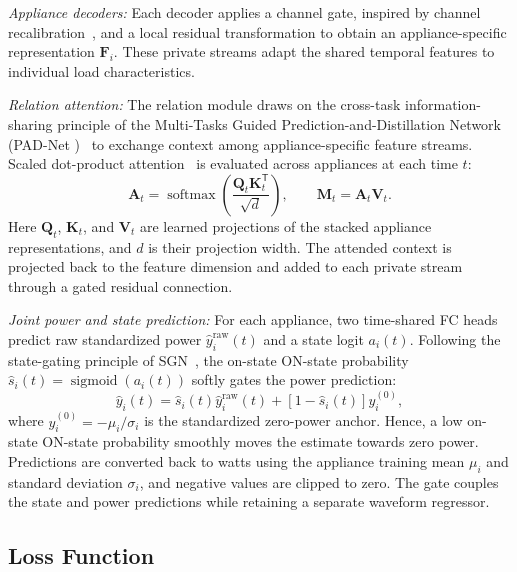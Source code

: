 \documentclass[journal]{IEEEtran}
\providecommand{\DIFadd}[1]{{\protect\color{blue} \sf #1}} %
\providecommand{\DIFdel}[1]{{\protect\color{red} \scriptsize #1}} %
\providecommand{\DIFaddbegin}{} %
\providecommand{\DIFaddend}{} %
\providecommand{\DIFdelbegin}{} %
\providecommand{\DIFdelend}{} %
\providecommand{\DIFscaledelfig}{0.5}
\newlength{\DIFdelgraphicswidth} %
\newlength{\DIFdelgraphicsheight} %
\providecommand{\DIFaddincludegraphics}[2][]{{\color{blue}\fbox{\DIFOincludegraphics[#1]{#2}}}} %
\providecommand{\DIFdelincludegraphics}[2][]{%
\sbox{\DIFdelgraphicsbox}{\DIFOincludegraphics[#1]{#2}}%
\settoboxwidth{\DIFdelgraphicswidth}{\DIFdelgraphicsbox} %
\settoboxtotalheight{\DIFdelgraphicsheight}{\DIFdelgraphicsbox} %
\scalebox{\DIFscaledelfig}{%
\parbox[b]{\DIFdelgraphicswidth}{\usebox{\DIFdelgraphicsbox}\\[-\baselineskip] \rule{\DIFdelgraphicswidth}{0em}}\llap{\resizebox{\DIFdelgraphicswidth}{\DIFdelgraphicsheight}{%
\setlength{\unitlength}{\DIFdelgraphicswidth}%
\begin{picture}(1,1)%
\thicklines\linethickness{2pt} %
{\color[rgb]{1,0,0}\put(0,0){\framebox(1,1){}}}%
{\color[rgb]{1,0,0}\put(0,0){\line( 1,1){1}}}%
{\color[rgb]{1,0,0}\put(0,1){\line(1,-1){1}}}%
\end{picture}%
}\hspace*{3pt}}} %
} %
\DeclareRobustCommand{\DIFaddbegin}{\DIFOaddbegin \let\includegraphics\DIFaddincludegraphics} %
\DeclareRobustCommand{\DIFaddend}{\DIFOaddend \let\includegraphics\DIFOincludegraphics} %
\DeclareRobustCommand{\DIFdelbegin}{\DIFOdelbegin \let\includegraphics\DIFdelincludegraphics} %
\DeclareRobustCommand{\DIFdelend}{\DIFOaddend \let\includegraphics\DIFOincludegraphics} %
\begin{document}
\textit{Appliance decoders:}
Each decoder applies a channel gate, inspired by channel recalibration~\cite{hu2018senet}, and a local residual transformation to obtain an appliance-specific representation $\mathbf{F}_i$. These private streams adapt the shared temporal features to individual load characteristics.

\textit{Relation attention:}
The relation module draws on the cross-task information-sharing principle of \DIFaddbegin \DIFadd{the Multi-Tasks Guided Prediction-and-Distillation Network (}\DIFaddend PAD-Net\DIFaddbegin \DIFadd{)}\DIFaddend ~\cite{xu2018padnet} to exchange context among appliance-specific feature streams. Scaled dot-product attention~\cite{vaswani2017attention} is evaluated across appliances at each time $t$:
\begin{equation}
\mathbf{A}_t=\operatorname{softmax}\!\left(
\frac{\mathbf{Q}_t\mathbf{K}_t^{\mathsf T}}{\sqrt{d}}
\right),\qquad
\mathbf{M}_t=\mathbf{A}_t\mathbf{V}_t.
\label{eq:relation-attention}
\end{equation}
Here $\mathbf{Q}_t$, $\mathbf{K}_t$, and $\mathbf{V}_t$ are learned projections of the stacked appliance representations, and $d$ is their projection width. The attended context is projected back to the feature dimension and added to each private stream through a gated residual connection.

\textit{Joint power and state prediction:}
For each appliance, two time-shared FC heads predict raw standardized power $\hat y_i^{\mathrm{raw}}(t)$ and a state logit $a_i(t)$. Following the state-gating principle of SGN~\cite{shin2019sgn}, the \DIFdelbegin \DIFdel{on-state }\DIFdelend \DIFaddbegin \DIFadd{ON-state }\DIFaddend probability $\hat s_i(t)=\operatorname{sigmoid}(a_i(t))$ softly gates the power prediction:
\begin{equation}
\hat y_i(t)=\hat s_i(t)\hat y_i^{\mathrm{raw}}(t)
+[1-\hat s_i(t)]y_i^{(0)},
\label{eq:soft-power-gate}
\end{equation}
where $y_i^{(0)}=-\mu_i/\sigma_i$ is the standardized zero-power anchor. Hence, a low \DIFdelbegin \DIFdel{on-state }\DIFdelend \DIFaddbegin \DIFadd{ON-state }\DIFaddend probability smoothly moves the estimate towards zero power. Predictions are converted back to watts using the appliance training mean $\mu_i$ and standard deviation $\sigma_i$, and negative values are clipped to zero. The gate couples the state and power predictions while retaining a separate waveform regressor.

\subsection{Loss Function}
\label{sec:loss}
\end{document}
